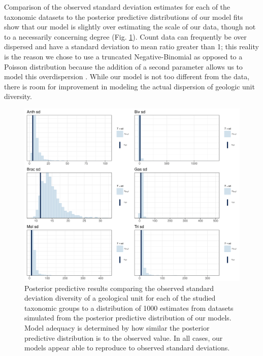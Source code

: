 \documentclass[12pt,letterpaper]{article}
\begin{document}
Comparison of the observed standard deviation estimates for each of the taxonomic datasets to the posterior predictive distributions of our model fits show that our model is slightly over estimating the scale of our data, though not to a necessarily concerning degree (Fig. \ref{fig:ppc_sd}). Count data can frequently be over dispersed and have a standard deviation to mean ratio greater than 1; this reality is the reason we chose to use a truncated Negative-Binomial as opposed to a Poisson distribution because the addition of a second parameter allows us to model this overdispersion \citep{ARM,BDA3}. While our model is not too different from the data, there is room for improvement in modeling the actual dispersion of geologic unit diversity.
\begin{figure}[ht]
  \centering
  \includegraphics[width=\textwidth,height=0.5\textheight,keepaspectratio=true]{figure/ppc_sd_diversity}
  \caption{Posterior predictive results comparing the observed standard deviation diversity of a geological unit for each of the studied taxonomic groups to a distribution of 1000 estimates from datasets simulated from the posterior predictive distribution of our models. Model adequacy is determined by how similar the posterior predictive distribution is to the observed value. In all cases, our models appear able to reproduce to observed standard deviations.}
  \label{fig:ppc_sd}
\end{figure}
\end{document}
